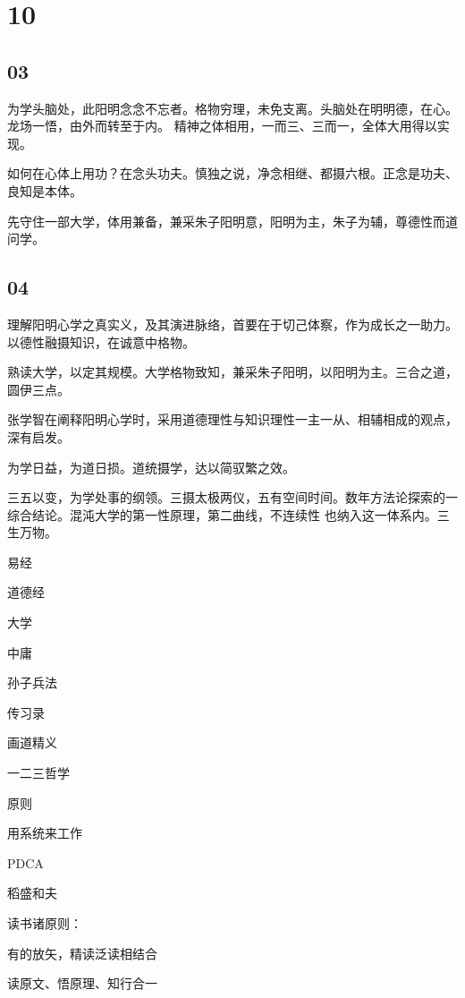 \section{10}

\subsection{03}

为学头脑处，此阳明念念不忘者。格物穷理，未免支离。头脑处在明明德，在心。龙场一悟，由外而转至于内。
精神之体相用，一而三、三而一，全体大用得以实现。

如何在心体上用功？在念头功夫。慎独之说，净念相继、都摄六根。正念是功夫、良知是本体。

先守住一部大学，体用兼备，兼采朱子阳明意，阳明为主，朱子为辅，尊德性而道问学。

\subsection{04}

理解阳明心学之真实义，及其演进脉络，首要在于切己体察，作为成长之一助力。以德性融摄知识，在诚意中格物。

熟读大学，以定其规模。大学格物致知，兼采朱子阳明，以阳明为主。三合之道，圆伊三点。

张学智在阐释阳明心学时，采用道德理性与知识理性一主一从、相辅相成的观点，深有启发。

为学日益，为道日损。道统摄学，达以简驭繁之效。

三五以变，为学处事的纲领。三摄太极两仪，五有空间时间。数年方法论探索的一综合结论。混沌大学的第一性原理，第二曲线，不连续性
也纳入这一体系内。三生万物。

\begin{enumbox}
\item 易经
\item 道德经
\item 大学
\item 中庸
\item 孙子兵法
\item 传习录
\item 画道精义
\item 一二三哲学
\item 原则
\item 用系统来工作
\item PDCA
\item 稻盛和夫
\end{enumbox}

读书诸原则：
\begin{enumbox}
\item 有的放矢，精读泛读相结合
\item 读原文、悟原理、知行合一
\end{enumbox}

